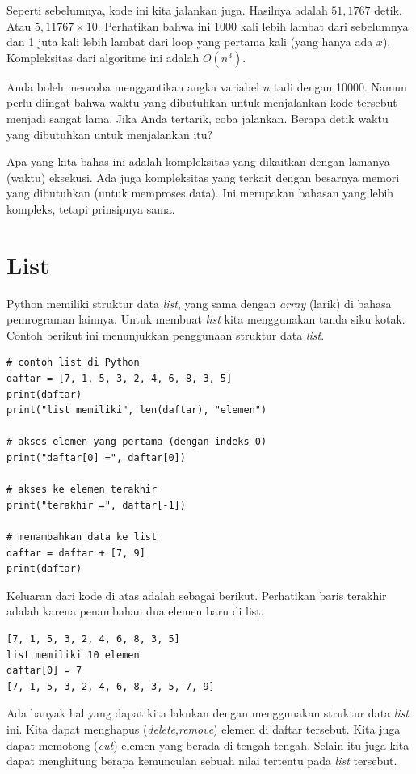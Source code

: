 Seperti sebelumnya, kode ini kita jalankan juga. Hasilnya adalah $51,1767$ detik.
Atau $5,11767 \times 10$. Perhatikan bahwa ini 1000 kali lebih lambat dari sebelumnya
dan 1 juta kali lebih lambat dari loop yang pertama kali (yang hanya ada $x$).
Kompleksitas dari algoritme ini adalah $O(n^3)$.

Anda boleh mencoba menggantikan angka variabel $n$ tadi dengan 10000.
Namun perlu diingat bahwa waktu yang dibutuhkan untuk menjalankan kode
tersebut menjadi sangat lama. Jika Anda tertarik, coba jalankan.
Berapa detik waktu yang dibutuhkan untuk menjalankan itu?

Apa yang kita bahas ini adalah kompleksitas yang dikaitkan dengan lamanya
(waktu) eksekusi. Ada juga kompleksitas yang terkait dengan besarnya
memori yang dibutuhkan (untuk memproses data).
Ini merupakan bahasan yang lebih kompleks, tetapi prinsipnya sama.

\section{List}
Python memiliki struktur data {\em list}, yang sama dengan {\em array}
(larik) di bahasa pemrograman lainnya. Untuk membuat {\em list} kita
menggunakan tanda siku kotak. Contoh berikut ini menunjukkan penggunaan 
struktur data {\em list}.

\begin{verbatim}
# contoh list di Python
daftar = [7, 1, 5, 3, 2, 4, 6, 8, 3, 5]
print(daftar)
print("list memiliki", len(daftar), "elemen")

# akses elemen yang pertama (dengan indeks 0)
print("daftar[0] =", daftar[0])

# akses ke elemen terakhir
print("terakhir =", daftar[-1])

# menambahkan data ke list
daftar = daftar + [7, 9]
print(daftar)
\end{verbatim}

Keluaran dari kode di atas adalah sebagai berikut.
Perhatikan baris terakhir adalah karena penambahan dua elemen baru
di list.
\begin{verbatim}
[7, 1, 5, 3, 2, 4, 6, 8, 3, 5]
list memiliki 10 elemen
daftar[0] = 7
[7, 1, 5, 3, 2, 4, 6, 8, 3, 5, 7, 9]
\end{verbatim}

Ada banyak hal yang dapat kita lakukan dengan menggunakan struktur data
{\em list} ini. Kita dapat menghapus ({\em delete},{\em remove}) 
elemen di daftar tersebut.
Kita juga dapat memotong ({\em cut}) elemen yang berada di tengah-tengah.
Selain itu juga kita dapat menghitung berapa kemunculan sebuah nilai
tertentu pada {\em list} tersebut.

